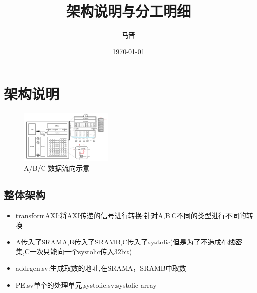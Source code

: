 \documentclass[zihao=-4, UTF8]{ctexart}
\title{架构说明与分工明细}
\author{马晋}
\date{\today}
\begin{document}
\maketitle
\tableofcontents
\clearpage

\section{架构说明}
\begin{figure}[H]
      \centering
      \includegraphics[width=0.4\textwidth]{架构.png}
      \caption{A/B/C 数据流向示意}
      \label{fig:sram-abc}
    \end{figure}
\subsection{整体架构}
\begin{itemize}
  \item transformAXI:将AXI传递的信号进行转换:针对A,B,C不同的类型进行不同的转换
  \item A传入了SRAMA,B传入了SRAMB,C传入了systolic(但是为了不造成布线密集,C一次只能向一个systolic传入32bit)
  \item addrgen.sv:生成取数的地址,在SRAMA，SRAMB中取数
  \item PE.sv单个的处理单元,systolic.sv:systolic array
\end{itemize}
\end{document}
